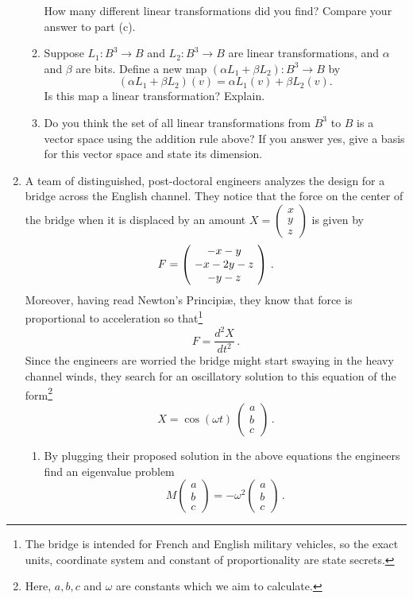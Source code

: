 \begin{enumerate}
\begin{enumerate}
How many different linear transformations did you find? Compare your answer to part (c). 
\item Suppose $L_1:B^3\to B$ and $L_2: B^3\to B$ are linear transformations, and $\alpha$ and $\beta$ are bits.
Define a new map 
$(\alpha L_1+\beta L_2):B^3\to B$ by \[(\alpha L_1+\beta L_2)(v)=\alpha L_1(v)+\beta L_2(v).\] Is this map a linear transformation? Explain.
\item Do you think the set of all linear transformations from $B^3$ to $B$ is a vector space using the addition rule above? If you answer yes, 
give a basis for this vector space and state its dimension.
\end{enumerate}

\item
A team of distinguished, post-doctoral engineers analyzes the design for a bridge across the
English channel. They notice that the force on the center of the bridge when it is displaced
by an amount $X=\begin{pmatrix}x\\y\\z\end{pmatrix}$ is given by 
\[
F=\left(\!\begin{array}{c} -x-y\\-x-2y-z\\-y-z \end{array}\!\right)\, .
\]
Moreover, having read Newton's Principi\ae{}, they know that force is proportional to acceleration so that\footnote{The bridge is intended for French and English military vehicles, so the exact units, coordinate system and constant of proportionality are state secrets.}
\[
F=\frac{d^2 X}{dt^2}\, .
\]
Since the engineers are worried the bridge might start swaying in the heavy channel winds, they search for 
an oscillatory  solution to this equation of the form\footnote{Here, $a,b,c$ and $\omega$ are constants which we aim to calculate.}
\[
X=\cos(\omega t) \ \begin{pmatrix} a \\ b \\ c\end{pmatrix}\, .
\]
\begin{enumerate}
\item By plugging their proposed solution in the above equations the engineers find an eigenvalue problem
\[
M \begin{pmatrix} a \\ b \\ c\end{pmatrix} = -\omega^2 \begin{pmatrix} a \\ b \\ c\end{pmatrix}\, .
\]
\end{enumerate}
\end{enumerate}
